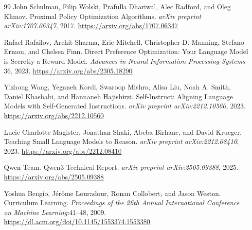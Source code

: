\begin{thebibliography}{99}
John Schulman, Filip Wolski, Prafulla Dhariwal, Alec Radford, and Oleg Klimov. Proximal Policy Optimization Algorithms. \emph{arXiv preprint arXiv:1707.06347}, 2017. \url{https://arxiv.org/abs/1707.06347}

Rafael Rafailov, Archit Sharma, Eric Mitchell, Christopher D. Manning, Stefano Ermon, and Chelsea Finn. Direct Preference Optimization: Your Language Model is Secretly a Reward Model. \emph{Advances in Neural Information Processing Systems} 36, 2023. \url{https://arxiv.org/abs/2305.18290}

Yizhong Wang, Yeganeh Kordi, Swaroop Mishra, Alisa Liu, Noah A. Smith, Daniel Khashabi, and Hannaneh Hajishirzi. Self-Instruct: Aligning Language Models with Self-Generated Instructions. \emph{arXiv preprint arXiv:2212.10560}, 2023. \url{https://arxiv.org/abs/2212.10560}

Lucie Charlotte Magister, Jonathan Shaki, Abeba Birhane, and David Krueger. Teaching Small Language Models to Reason. \emph{arXiv preprint arXiv:2212.08410}, 2023. \url{https://arxiv.org/abs/2212.08410}

Qwen Team. {Qwen3} Technical Report. \emph{arXiv preprint arXiv:2505.09388}, 2025. \url{https://arxiv.org/abs/2505.09388}

Yoshua Bengio, J\'{e}r\^{o}me Louradour, Ronan Collobert, and Jason Weston. Curriculum Learning. \emph{Proceedings of the 26th Annual International Conference on Machine Learning}:41--48, 2009. \url{https://dl.acm.org/doi/10.1145/1553374.1553380}

\end{thebibliography}